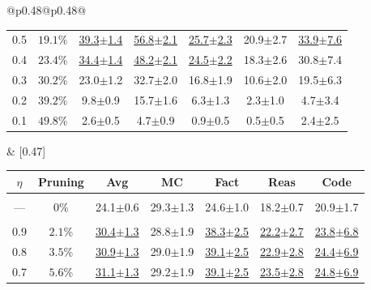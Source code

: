 \begin{table}[t]
\begin{tabular}{@{}p{}@{}p{}@{}}
{\begin{tabular}{c c c c c c c}
\rowcolor{white} 0.5 & $19.1\%$ & \underline{39.3{\scriptsize$\pm$1.4}} & \underline{56.8{\scriptsize$\pm$2.1}} & \underline{25.7{\scriptsize$\pm$2.3}} & 20.9{\scriptsize$\pm$2.7} & \underline{33.9{\scriptsize$\pm$7.6}} \\
\rowcolor{white} 0.4 & $23.4\%$ & \underline{34.4{\scriptsize$\pm$1.4}} & \underline{48.2{\scriptsize$\pm$2.1}} & \underline{24.5{\scriptsize$\pm$2.2}} & 18.3{\scriptsize$\pm$2.6} & 30.8{\scriptsize$\pm$7.4} \\
\rowcolor{white} 0.3 & $30.2\%$ & 23.0{\scriptsize$\pm$1.2} & 32.7{\scriptsize$\pm$2.0} & 16.8{\scriptsize$\pm$1.9} & 10.6{\scriptsize$\pm$2.0} & 19.5{\scriptsize$\pm$6.3} \\
\rowcolor{white} 0.2 & $39.2\%$ & 9.8{\scriptsize$\pm$0.9} & 15.7{\scriptsize$\pm$1.6} & 6.3{\scriptsize$\pm$1.3} & 2.3{\scriptsize$\pm$1.0} & 4.7{\scriptsize$\pm$3.4} \\
\rowcolor{white} 0.1 & $49.8\%$ & 2.6{\scriptsize$\pm$0.5} & 4.7{\scriptsize$\pm$0.9} & 0.9{\scriptsize$\pm$0.5} & 0.5{\scriptsize$\pm$0.5} & 2.4{\scriptsize$\pm$2.5} \\
\bottomrule
\end{tabular}
} &
[0.47\textwidth]{
\begin{tabular}{c c c c c c c}
\toprule
\textbf{$\eta$} & \textbf{Pruning} & \textbf{Avg} & \textbf{MC} & \textbf{Fact} & \textbf{Reas} & \textbf{Code} \\
\midrule
\rowcolor{lightgray} \multicolumn{7}{c}{\rule{0pt}{2.2ex}\textbf{Dense Model}\rule[-0.8ex]{0pt}{0pt}} \\
\rowcolor{white} --- & 0\% & 24.1{\scriptsize$\pm$0.6} & 29.3{\scriptsize$\pm$1.3} & 24.6{\scriptsize$\pm$1.0} & 18.2{\scriptsize$\pm$0.7} & 20.9{\scriptsize$\pm$1.7} \\
\midrule
\rowcolor{lightgray} \multicolumn{7}{c}{\rule{0pt}{2.2ex}\textbf{SubspacePath Pruner}\rule[-0.8ex]{0pt}{0pt}} \\
\rowcolor{white} 0.9 & $2.1\%$ & \underline{30.4{\scriptsize$\pm$1.3}} & 28.8{\scriptsize$\pm$1.9} & \underline{38.3{\scriptsize$\pm$2.5}} & \underline{22.2{\scriptsize$\pm$2.7}} & \underline{23.8{\scriptsize$\pm$6.8}} \\
\rowcolor{white} 0.8 & $3.5\%$ & \underline{30.9{\scriptsize$\pm$1.3}} & 29.0{\scriptsize$\pm$1.9} & \underline{39.1{\scriptsize$\pm$2.5}} & \underline{22.9{\scriptsize$\pm$2.8}} & \underline{24.4{\scriptsize$\pm$6.9}} \\
\rowcolor{white} 0.7 & $5.6\%$ & \underline{31.1{\scriptsize$\pm$1.3}} & 29.2{\scriptsize$\pm$1.9} & \underline{39.1{\scriptsize$\pm$2.5}} & \underline{23.5{\scriptsize$\pm$2.8}} & \underline{24.8{\scriptsize$\pm$6.9}} \\

\end{tabular}}
\end{tabular}
\end{table}
